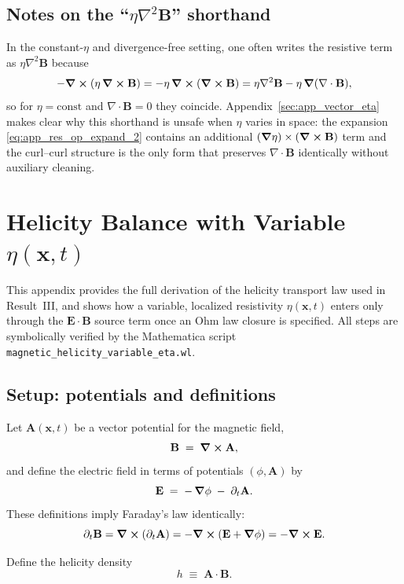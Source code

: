 \documentclass[11pt]{article}
\theoremstyle{plain}
\theoremstyle{definition}
\theoremstyle{remark}
\newcommand{\diver}{\nabla\cdot}
\newcommand{\A}{\mathbf{A}}
\newcommand{\B}{\mathbf{B}}
\newcommand{\E}{\mathbf{E}}
\begin{document}
\subsection{Notes on the ``$\eta\nabla^2\B$'' shorthand}
In the constant-$\eta$ and divergence-free setting, one often writes the resistive term as
$\eta\nabla^2\B$ because
\[
-\curl(\eta\,\curl\B)
=-\eta\,\curl(\curl\B)
=\eta\nabla^2\B-\eta\,\grad(\diver\B),
\]
so for $\eta=\text{const}$ and $\diver\B=0$ they coincide. Appendix~\ref{sec:app_vector_eta} makes clear
why this shorthand is unsafe when $\eta$ varies in space: the expansion \eqref{eq:app_res_op_expand_2}
contains an additional $(\grad\eta)\times(\curl\B)$ term and the curl--curl structure is the only form
that preserves $\diver\B$ identically without auxiliary cleaning.

\section{Helicity Balance with Variable $\eta(\mathbf{x},t)$}\label{sec:app_helicity_eta}

This appendix provides the full derivation of the helicity transport law used in Result~III, and shows
how a variable, localized resistivity $\eta(\mathbf{x},t)$ enters only through the $\E\cdot\B$ source
term once an Ohm law closure is specified. All steps are symbolically verified by the Mathematica script
\texttt{magnetic\_helicity\_variable\_eta.wl}.

\subsection{Setup: potentials and definitions}
Let $\A(\mathbf{x},t)$ be a vector potential for the magnetic field,
\begin{equation}\label{eq:app_helicity_B}
  \B \;=\; \curl\A,
\end{equation}
and define the electric field in terms of potentials $(\phi,\A)$ by
\begin{equation}\label{eq:app_helicity_E}
  \E \;=\; -\,\grad\phi \;-\; \partial_t\A.
\end{equation}
These definitions imply Faraday's law identically:
\[
\partial_t\B=\curl(\partial_t\A)=-\curl(\E+\grad\phi)=-\curl\E.
\]

Define the helicity density
\begin{equation}\label{eq:app_helicity_density}
  h \;\equiv\; \A\cdot\B.
\end{equation}
\end{document}

